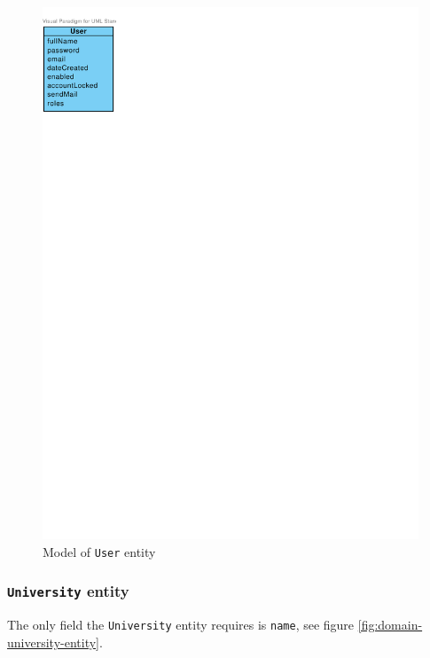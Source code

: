 \begin{figure}[h]
    \centering
        \includegraphics[trim=0 675 480 30, clip, keepaspectratio, scale=0.8]{./images/domain-user-entity.pdf}
    \caption{Model of \texttt{User} entity}
    \label{fig:domain-user-entity}
\end{figure}

\subsubsection{\texttt{University} entity}

The only field the \texttt{University} entity requires is \texttt{name}, see figure \ref{fig:domain-university-entity}.

